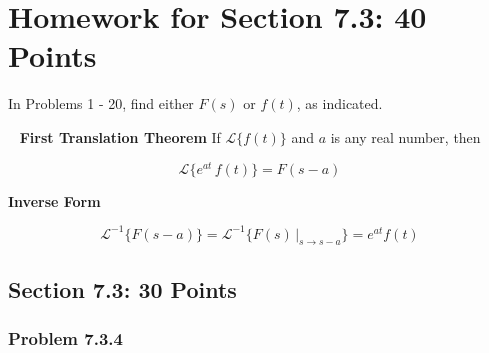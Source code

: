 \section*{Homework for Section 7.3: 40 Points}
\vspace{-0.5cm}
In Problems 1 - 20, find either $F(s)$ or $f(t)$, as indicated.

{}
\begin{boxedtheorem}[7.3.1] \hypertarget{def:Theorem 7.3.1}{}
\ \newline
\textbf{First Translation Theorem} \newline
  If $\mathscr{L}\{f(t)\}$ and $a$ is any real number, then

  \vspace{-0.25cm}
  \begin{equation}
    \mathscr{L}\{e^{at} \, f(t)\} = F(s-a)
  \end{equation}

  \textbf{Inverse Form}

  \vspace{-0.25cm}
  \begin{equation}
    \mathscr{L}^{-1} \{F(s-a)\} = \mathscr{L}^{-1} \{\left. F(s) \, \right|_{s \to s-a}\} = e^{at} f(t)
  \end{equation}
  \vspace{0.15cm}

\end{boxedtheorem}

\subsection*{Section 7.3: 30 Points}

  \subsubsection*{Problem 7.3.4}
  \vspace{-0.5cm}

